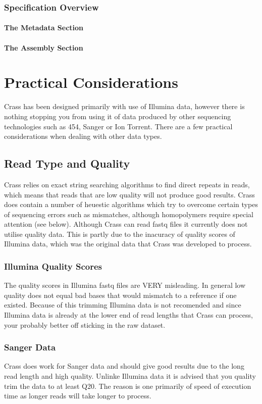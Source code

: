 \documentclass[11pt]{article} %
\begin{document}
\subsubsection{Specification Overview}
\paragraph{The Metadata Section}
\paragraph{The Assembly Section}

\section{Practical Considerations}
Crass has been designed primarily with use of Illumina data, however there is nothing stopping you from using it of data produced by other sequencing technologies such as 454, Sanger or Ion Torrent.  There are a few practical considerations when dealing with other data types.
\subsection{Read Type and Quality}
 Crass relies on exact string searching algorithms to find direct repeats in reads, which means that reads that are low quality will not produce good results.  Crass does contain a number of heuestic algorithms which try to overcome certain types of sequencing errors such as mismatches, although homopolymers require special attention (see below).  Although Crass can read fastq files it currently does not utilise quality data.  This is partly due to the inacuracy of quality scores of Illumina data, which was the original data that Crass was developed to process. 
\subsubsection{Illumina Quality Scores}
The quality scores in Illumina fastq files are VERY misleading.  In general low quality does not equal bad bases that would mismatch to a reference if one existed.  Because of this trimming Illumina data is not recomended and since Illumina data is already at the lower end of read lengths that Crass can process, your probably better off sticking in the raw dataset.
\subsubsection{Sanger Data}
Crass does work for Sanger data and should give good results due to the long read length and high quality.  Unlinke Illumina data it is advised that you quality trim the data to at least Q20.  The reason is one primarily of speed of execution time as longer reads will take longer to process.
\end{document}
